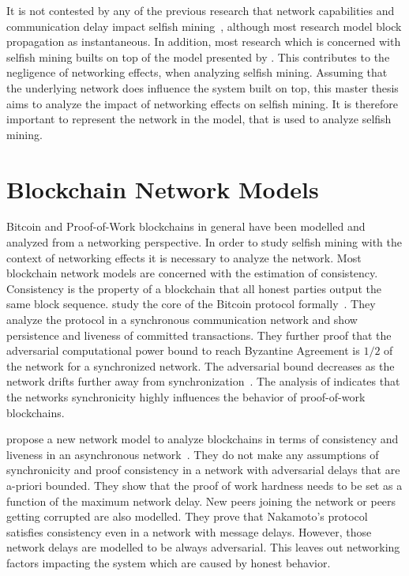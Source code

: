 It is not contested by any of the previous research that network capabilities and communication delay impact selfish mining~\cite{multi_sm}, although most research model block propagation as instantaneous.
In addition, most research which is concerned with selfish mining builts on top of the model presented by \citeauthor{optimal_sm}.
This contributes to the negligence of networking effects, when analyzing selfish mining.
Assuming that the underlying network does influence the system built on top, this master thesis aims to analyze the impact of networking effects on selfish mining. It is therefore important to represent the network in the model, that is used to analyze selfish mining.

\section{Blockchain Network Models}
Bitcoin and Proof-of-Work blockchains in general have been modelled and analyzed from a networking perspective. In order to study selfish mining with the context of networking effects it is necessary to analyze the network. 
Most blockchain network models are concerned with the estimation of consistency. Consistency is the property of a blockchain that all honest parties output the same block sequence.
\citeauthor{garay2015bitcoin} study the core of the Bitcoin protocol formally~\cite{garay2015bitcoin}. They analyze the protocol in a synchronous communication network and show persistence and liveness of committed transactions. They further proof that the adversarial computational power bound to reach Byzantine Agreement is $1/2$ of the network for a synchronized network. The adversarial bound decreases as the network drifts further away from synchronization~\cite{garay2015bitcoin}.
The analysis of \citeauthor{garay2015bitcoin} indicates that the networks synchronicity highly influences the behavior of proof-of-work blockchains.

\citeauthor{pass2017analysis} propose a new network model to analyze blockchains in terms of consistency and liveness in an asynchronous network~\cite{pass2017analysis}. They do not make any assumptions of synchronicity and proof consistency in a network with adversarial delays that are a-priori bounded. They show that the proof of work hardness needs to be set as a function of the maximum network delay. New peers joining the network or peers getting corrupted are also modelled. They prove that Nakamoto's protocol satisfies consistency even in a network with message delays. However, those network delays are modelled to be always adversarial. This leaves out networking factors impacting the system which are caused by honest behavior.

